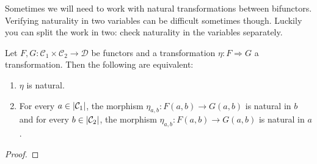 Sometimes we will need to work with natural transformations between
bifunctors. Verifying naturality in two variables can be difficult
sometimes though. Luckily you can split the work in two: check
naturality in the variables separately.

\begin{proposition}\label{proposition:NaturalityInToVariables}
  Let \(F, G : \mathcal{C}_1 \times \mathcal{C}_2 \to \mathcal{D}\) be functors and a transformation \(\eta : F
  \Rightarrow G\) a transformation. Then the following are equivalent:
  \begin{enumerate}[leftmargin=*]
  \item \(\eta\) is natural.
  \item For every \(a \in \left\lvert\mathcal{C}_1\right\rvert\), the morphism
    \(\eta_{a, b} : F(a, b) \to G(a, b)\) is natural in \(b\) and for every
    \(b \in \left\lvert\mathcal{C}_2\right\rvert\), the morphism
    \(\eta_{a, b} : F(a, b) \to G(a, b)\) is natural in \(a\).
  \end{enumerate}
\end{proposition}

\begin{proof}
  
\end{proof}


